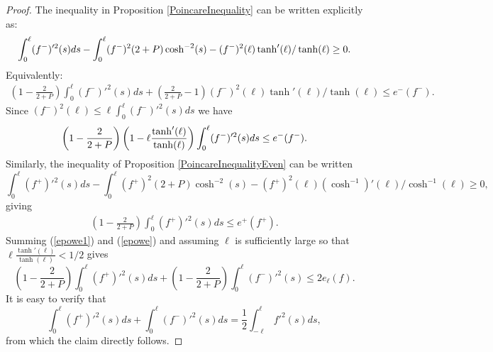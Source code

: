 \documentclass{amsart}
\begin{document}
 \begin{proof}

The inequality in Proposition \ref{PoincareInequality} can be written explicitly as:
\begin{align} \notag
\int_0^\ell (f^{-})'^2 (s)ds - \int_0^\ell (f^-)^2 (2 + P) \cosh^{-2} (s) - (f^-)^2(\ell)  \tanh'(\ell)/ \tanh(\ell) \geq 0.
\end{align}
Equivalently:
\begin{align} \label{epowe1}
\left(1 - \frac{2}{2 + P} \right)\int_0^\ell (f^{-})'^2 (s) ds + \left( \frac{2}{2 + P} -1 \right)(f^-)^2(\ell)  \tanh'(\ell)/ \tanh(\ell) \leq  e^-(f^-).
\end{align}
Since $(f^-)^2(\ell) \leq \ell \int_0^\ell (f^-)'^2(s) ds$ we have
\begin{align} \notag
\left(1 - \frac{2}{2 + P} \right) \left(1 - \ell  \frac{\tanh'(\ell)}{ \tanh(\ell)}\right)\int_0^\ell (f^{-})'^2 (s) ds  \leq  e^-(f^-).
\end{align}
Similarly,  the inequality of  Proposition \ref{PoincareInequalityEven} can be written
\[
\int_0^\ell (f^{+})'^2 (s)ds - \int_0^\ell (f^+)^2 (2 + P) \cosh^{-2} (s) - (f^+)^2(\ell)  (\cosh^{-1})'(\ell)/ \cosh^{-1}(\ell) \geq 0,
\]
giving
\begin{align}\label{epowe}
\left(1 - \frac{2}{2 + P} \right)\int_0^\ell (f^{+})'^2 (s) ds \leq  e^+(f^+).
\end{align}
Summing (\ref{epowe1}) and (\ref{epowe}) and assuming $\ell$ is sufficiently large so that $\ell \frac{\tanh'(\ell)}{\tanh(\ell)} < 1/2$ gives 
\[
\left(1 - \frac{2}{2 + P} \right)\int_0^\ell (f^{+})'^2 (s) ds +  \left( 1 - \frac{2}{2 + P} \right)  \int_{0}^\ell (f^{-})'^2(s)  \leq 2 e_\ell (f).
\]
 It is easy to verify that 
 \[
\int_0^\ell (f^{+})'^2 (s) ds + \int_0^\ell (f^{-})'^2 (s) ds = \frac{1}{2} \int_{-\ell}^{\ell} f'^2 (s)ds,
 \]
 from which the claim directly follows.
 \end{proof}
\end{document}

